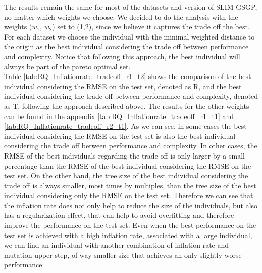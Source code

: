 \documentclass[manuscript, review, anonymous]{acmart} %
\begin{document}
The results remain the same for most of the datasets and version of SLIM-GSGP, no matter which weights we choose.
We decided to do the analysis with the weights ($w_1$, $w_2$) set to (1,2),
since we believe it captures the trade off the best.
For each dataset we choose the individual with the minimal
weighted distance to the origin as the best individual considering
the trade off between
performance and complexity. Notice that following this approach, 
the best individual will always be part of the pareto optimal set.\\

\noindent Table \ref{tab:RQ_Inflationrate_tradeoff_r1_t2} shows the comparison of the best individual considering
the RMSE on the test set, denoted as R,
and the best individual considering the trade off between performance
and complexity, denoted as T, following the approach described above.
The results for the other weights can be found in the appendix 
\ref{tab:RQ_Inflationrate_tradeoff_r1_t1} and \ref{tab:RQ_Inflationrate_tradeoff_r2_t1}.
As we can see, in some cases the best individual
considering the RMSE on the test set is also the
best individual considering the trade off between performance and complexity.
In other cases,
the RMSE of the best individuals regarding the trade off
is only larger by a small percentage than the RMSE
of the best individual considering the RMSE on the test
set.
On the other hand, the tree size of the best
individual considering the trade off is always smaller, most times by
multiples,
than the tree size of the best individual considering only
the RMSE on the test set.
Therefore we can see that the inflation rate does not only help
to reduce the size of the individuals, but also has
a regularization effect,
that can help to avoid overfitting and therefore improve the
performance on the test set. Even when the best performance
on the test set
is achieved with a high inflation rate, associated with a
large individual, we can find an individual with another combination
of inflation rate and mutation upper step, of way
smaller size that achieves an only slightly worse performance.
\end{document}
